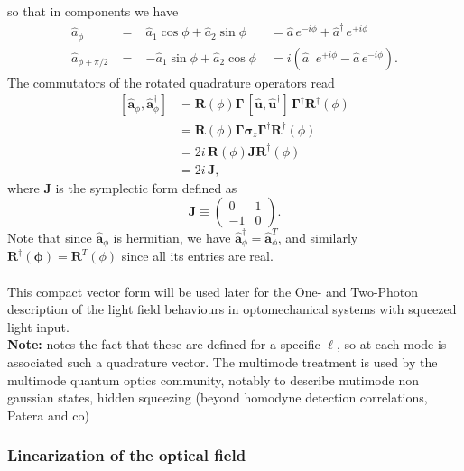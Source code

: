 so that in components we have 
\begin{equation}
\begin{alignedat}{3}
\hat a_\phi \;&=\;& \hat a_1 \cos\phi + \hat a_2 \sin\phi \;&= \hat a\,e^{-i\phi} + \hat a^\dagger\,e^{+i\phi}\\
\hat a_{\phi+\pi/2} \;&=\;& -\hat a_1 \sin\phi + \hat a_2 \cos\phi \;&= i\!\left(\hat a^\dagger\,e^{+i\phi} - \hat a\,e^{-i\phi}\right).
\end{alignedat}
\end{equation}
The commutators of the rotated quadrature operators read
\begin{equation}
\begin{aligned}
[\hat{\mathbf{a}}_\phi , \hat{\mathbf{a}}_\phi^{\dagger}]
&= \mathbf R(\phi) \mathbf \Gamma\,[\hat{\mathbf{u}},\hat{\mathbf{u}}^{\dagger}]\, \mathbf \Gamma^{\dagger} \mathbf R^{\dagger}(\phi) \\[4pt]
&= \mathbf R(\phi)\mathbf \Gamma \mathbf \sigma_z \mathbf \Gamma^{\dagger} \mathbf R^{\dagger}(\phi) \\[4pt]
&= 2i\, \mathbf R(\phi) \mathbf J \mathbf R^{\dagger}(\phi) \\[4pt]
&= 2i\,\mathbf J,
\end{aligned}
\end{equation}
where $\mathbf{J}$ is the symplectic form defined as
\begin{equation}
\mathbf{J} \equiv
\begin{pmatrix}
0 & 1 \\
-1 & 0
\end{pmatrix}.
\end{equation}
Note that since $\hat{\mathbf{a}}_\phi$ is hermitian, we have $\hat{\mathbf{a}}_\phi^\dagger = \hat{\mathbf{a}}_\phi^T$, and similarly $\mathbf{R^\dagger(\phi)} = \mathbf{R}^T(\phi)$ since all its entries are real. \\ 
\\
This compact vector form will be used later for the One- and Two-Photon description of the light field behaviours in optomechanical systems with squeezed light input. \\
\noindent \textbf{Note:} \color{red} notes the fact that these are defined for a specific $\ell$, so at each mode is associated such a quadrature vector. The multimode treatment is used by the multimode quantum optics community, notably to describe mutimode non gaussian states, hidden squeezing (beyond homodyne detection correlations, Patera and co) \color{black}
\subsubsection{Linearization of the optical field}

